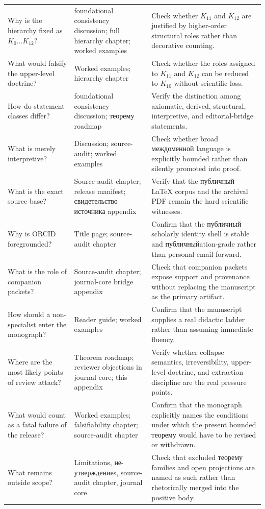 \begin{longtable}{p{3.4cm} p{4.4cm} p{5.7cm}}
Why is the hierarchy fixed as \(K_0\dots K_{12}\)? & foundational consistency discussion; full hierarchy chapter; worked examples & Check whether \(K_{11}\) and \(K_{12}\) are justified by higher-order structural roles rather than decorative counting. \\
What would falsify the upper-level doctrine? & Worked examples; hierarchy chapter & Check whether the roles assigned to \(K_{11}\) and \(K_{12}\) can be reduced to \(K_{10}\) without scientific loss. \\
How do statement classes differ? & foundational consistency discussion; теорему roadmap & Verify the distinction among axiomatic, derived, structural, interpretive, and editorial-bridge statements. \\
What is merely interpretive? & Discussion; source-audit; worked examples & Check whether broad междоменной language is explicitly bounded rather than silently promoted into proof. \\
What is the exact source base? & Source-audit chapter; release manifest; свидетельство источника appendix & Verify that the публичный LaTeX corpus and the archival PDF remain the hard scientific witnesses. \\
Why is ORCID foregrounded? & Title page; source-audit chapter & Confirm that the публичный scholarly identity shell is stable and публичныйation-grade rather than personal-email-forward. \\
What is the role of companion packets? & Source-audit chapter; journal-core bridge appendix & Check that companion packets expose support and provenance without replacing the manuscript as the primary artifact. \\
How should a non-specialist enter the monograph? & Reader guide; worked examples & Confirm that the manuscript supplies a real didactic ladder rather than assuming immediate fluency. \\
Where are the most likely points of review attack? & Theorem roadmap; reviewer objections in journal core; this appendix & Verify whether collapse semantics, irreversibility, upper-level doctrine, and extraction discipline are the real pressure points. \\
What would count as a fatal failure of the release? & Worked examples; falsifiability chapter; source-audit chapter & Confirm that the monograph explicitly names the conditions under which the present bounded теорему would have to be revised or withdrawn. \\
What remains outside scope? & Limitations, не-утверждениеs, source-audit chapter, journal core & Check that excluded теорему families and open projections are named as such rather than rhetorically merged into the positive body. \\
\end{longtable}

